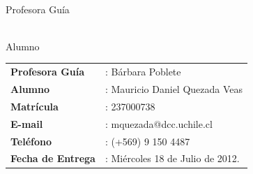 \documentclass[11pt,letterpaper]{article}
\begin{document}
\begin{titlepage}
\begin{center}
\end{center}
\vspace*{1.6 in}
\begin{minipage}{0.5\textwidth}
\begin{center}\Large
 \makebox[2.5in]{\hrulefill}\\
 Profesora Guía
\end{center}
\end{minipage}
\begin{minipage}{0.5\textwidth}
\begin{center}\Large
 \makebox[2.5in]{\hrulefill}\\
 Alumno
\end{center}
\end{minipage}
\vspace*{1.6 in}
\begin{flushright}
\begin{tabular}{ll}
\textbf{Profesora Guía}	&: Bárbara Poblete \\
\textbf{Alumno} 	&: Mauricio Daniel Quezada Veas\\
\textbf{Matrícula}&: 237000738\\
\textbf{E-mail} 	&: mquezada@dcc.uchile.cl\\
\textbf{Teléfono}	&: (+569) 9 150 4487 \\
\textbf{Fecha de Entrega} &: Miércoles 18 de Julio de 2012. \\
\end{tabular}
\end{flushright}
\end{titlepage}


\pagestyle{encabezado}
\end{document}
